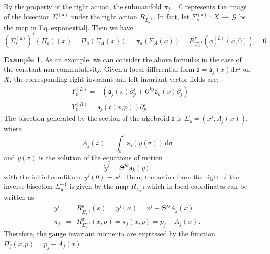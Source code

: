 \documentclass[12pt,a4paper]{article}
\numberwithin{equation}{section}
\theoremstyle{definition}
\newtheorem{example}[equation]{Example}
\newcommand{\cG}{\mathcal{G}}
\newcommand{\dd}{\mathrm{d}}
\newcommand{\sfa}{\mathsf{a}}
\begin{document}
By the property of the right action, the submanifold $\pi_j=0$ represents the image of the bisection $\Sigma^{(\sfa)}$ under the right action $R_{\Sigma_{\sfa}^{-1}}$. In fact, let $\Sigma_s^{(\sfa)}\,\colon\,X\,\rightarrow\,\cG$ be the map in Eq.\eqref{exponential}. Then we have
\begin{equation}\label{zero_section}
(\Sigma_s^{(\sfa)})^*(\Pi_a)(x)=\Pi_a(\Sigma_A(x))=\pi_a(\Sigma_A(x))=R^{\pi}_{\Sigma^{-1}_A}(\phi^{(L)}_A(x,0))=0
\end{equation}

\begin{example}
As an example, we can consider the above formulas in the case of the constant non-commutativity. Given a local differential form $\sfa =\sfa_{j}(x)\dd x^j$ on $X$, the corresponding right-invariant and left-invariant vector fields are:
\begin{eqnarray}
& Y^{(L)}_{\sfa} = -({\sfa}_j(x)\partial_p^j + \Theta^{kj}{\sfa}_k(x)\partial_j) \\
& Y^{(R)}_{\sfa} = {\sfa}_j(t(x,p))\partial_p^j\,.
\end{eqnarray}
The bisection generated by the section of the algebroid $\sfa$ is  $\Sigma_{\sfa} = (x^j, A_j(x))$, where 
\[
A_j(x)=\int_{0}^1{\sfa}_j(y(\sigma))\,\dd \sigma
\]
and $y(\sigma)$ is the solution of the equations of motion
\[
\dot{y}^j = \Theta^{jk}{\sfa}_k(y)
\]
with the initial conditions $y^j(0)=x^j$. {Then, the action from the right} of the inverse bisection $\Sigma^{-1}_{\sfa}$ is given by the map $R_{\Sigma^{-1}_{\sfa}}$ which in local coordinates can be written as 
\begin{eqnarray}
y^j &=& R^{y}_{\Sigma^{-1}_{\sfa}}(x) = y^j(x) = x^j+\Theta^{ij}A_j(x) \\
\pi_j &=& R^{\pi}_{\Sigma^{-1}_{\sfa}}(x,p) = \pi_j (x,p)=p_j-A_j(x) \,.
\end{eqnarray}
Therefore, the gauge invariant momenta are expressed by the function $\Pi_j(x,p)=p_j-A_j(x)$. 
\end{example}
\end{document}
